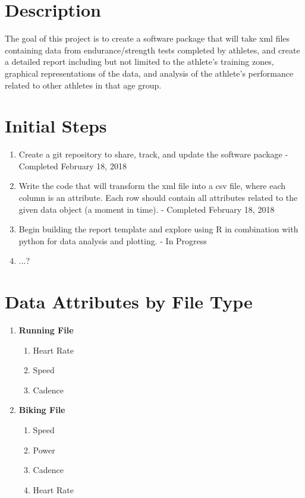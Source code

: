 \documentclass{article}
\begin{document}
\maketitle

\section*{Description} The goal of this project is to create a software package that will take xml files containing data from endurance/strength tests completed by athletes, and create a detailed report including but not limited to the athlete's training zones, graphical representations of the data, and analysis of the athlete's performance related to other athletes in that age group.

\section*{Initial Steps}
\begin{enumerate}
	\item Create a git repository to share, track, and update the software package - Completed February 18, 2018
	\item Write the code that will transform the xml file into a csv file, where each column is an attribute. Each row should contain all attributes related to the given data object (a moment in time). - Completed February 18, 2018
	\item Begin building the report template and explore using R in combination with python for data analysis and plotting. - In Progress
	\item ...?
\end{enumerate}
\section*{Data Attributes by File Type} 
\begin{enumerate}
	\item[]\textbf{Running File}
	\begin{enumerate}
		\item Heart Rate
		\item Speed
		\item Cadence
	\end{enumerate}
	\item[]\textbf{Biking File}
	\begin{enumerate}
		\item Speed
		\item Power
		\item Cadence
		\item Heart Rate
	\end{enumerate}
\end{enumerate}
\end{document}
